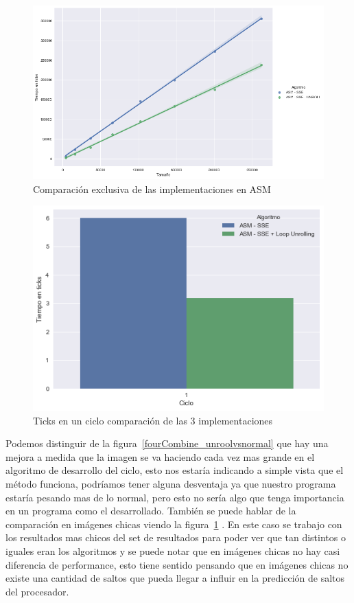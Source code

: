 \begin{figure}[H]
	\centering
	\includegraphics[scale=0.5]{img/fourCombine_UnrollvsNormal_asmOnly.png}
	\caption{Comparación exclusiva de las implementaciones en ASM}
	\label{fourCombine_unroolvsnormal_asmOnly}
\end{figure}

\begin{figure}[H]
	\centering
	\includegraphics[scale=0.5]{img/fourCombine_ticks_en_ciclo.png}
	\caption{Ticks en un ciclo comparación de las 3 implementaciones}
	\label{fourCombine_ticksciclo}
\end{figure}

Podemos distinguir de la figura~\ref{fourCombine_unroolvsnormal} que hay una mejora a medida que la imagen se va haciendo cada vez mas grande en el algoritmo de desarrollo del ciclo, esto nos estaría indicando a simple vista que el método funciona, podríamos tener alguna desventaja ya que nuestro programa estaría pesando mas de lo normal, pero esto no sería algo que tenga importancia en un programa como el desarrollado. También se puede hablar de la comparación en imágenes chicas viendo la figura~\ref{fourCombine_unroolvsnormal_asmOnly} . En este caso se trabajo con los resultados mas chicos del set de resultados para poder ver que tan distintos o iguales eran los algoritmos y se puede notar que en imágenes chicas no hay casi diferencia de performance, esto tiene sentido pensando que en imágenes chicas no existe una cantidad de saltos que pueda llegar a influir en la predicción de saltos del procesador.

